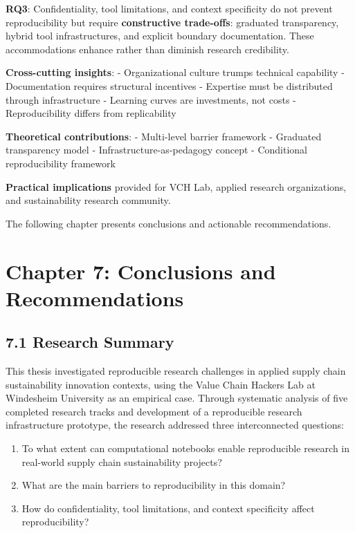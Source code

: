 \documentclass[
  oneside,
  open=any]{scrbook}
\providecommand{\tightlist}{%
  \setlength{\itemsep}{0pt}\setlength{\parskip}{0pt}}\usepackage{longtable,booktabs,array}
\begin{document}
\textbf{RQ3}: Confidentiality, tool limitations, and context specificity
do not prevent reproducibility but require \textbf{constructive
trade-offs}: graduated transparency, hybrid tool infrastructures, and
explicit boundary documentation. These accommodations enhance rather
than diminish research credibility.

\textbf{Cross-cutting insights}: - Organizational culture trumps
technical capability - Documentation requires structural incentives -
Expertise must be distributed through infrastructure - Learning curves
are investments, not costs - Reproducibility differs from replicability

\textbf{Theoretical contributions}: - Multi-level barrier framework -
Graduated transparency model - Infrastructure-as-pedagogy concept -
Conditional reproducibility framework

\textbf{Practical implications} provided for VCH Lab, applied research
organizations, and sustainability research community.

The following chapter presents conclusions and actionable
recommendations.

\chapter{Chapter 7: Conclusions and
Recommendations}\label{chapter-7-conclusions-and-recommendations}

\section{7.1 Research Summary}\label{research-summary}

This thesis investigated reproducible research challenges in applied
supply chain sustainability innovation contexts, using the Value Chain
Hackers Lab at Windesheim University as an empirical case. Through
systematic analysis of five completed research tracks and development of
a reproducible research infrastructure prototype, the research addressed
three interconnected questions:

\begin{enumerate}
\def\labelenumi{\arabic{enumi}.}
\tightlist
\item
  To what extent can computational notebooks enable reproducible
  research in real-world supply chain sustainability projects?
\item
  What are the main barriers to reproducibility in this domain?
\item
  How do confidentiality, tool limitations, and context specificity
  affect reproducibility?
\end{enumerate}
\end{document}
